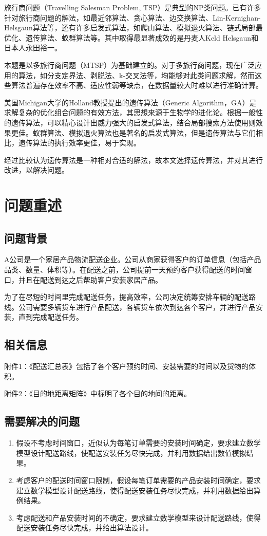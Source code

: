 \documentclass[UTF8,cs4size]{ctexart}
\begin{document}
旅行商问题（Travelling Salesman Problem, TSP）是典型的NP类问题。已有许多针对旅行商问题的解法，如最近邻算法、贪心算法、边交换算法、Lin-Kernighan-Helsgaun算法等，还有许多启发式算法，如爬山算法、模拟退火算法、链式局部最优化、遗传算法、蚁群算法等。其中取得最显著成效的是丹麦人Keld Helsgaun和日本人永田裕一。

本题是以多旅行商问题（MTSP）为基础建立的。对于多旅行商问题，现在广泛应用的算法，如分支定界法、剥脱法、k-{}交叉法等，均能够对此类问题求解，然而这些算法普遍存在效率不高、适应性弱等缺点，在数据量较大时难以进行准确计算。

美国Michigan大学的Holland教授提出的遗传算法（Generic Algorithm，GA）是求解复杂的优化组合问题的有效方法，其思想来源于生物学的进化论。根据一般性的遗传算法，可以精心设计出威力强大的启发式算法，结合局部搜索方法使用则效果更佳。蚁群算法、模拟退火算法也是著名的启发式算法，但是遗传算法与它们相比，遗传算法的执行效率更佳，易于实现。

经过比较认为遗传算法是一种相对合适的解法，故本文选择遗传算法，并对其进行改进，以解决问题。
\section{问题重述}
\subsection{问题背景}
A公司是一个家居产品物流配送企业。公司从商家获得客户的订单信息（包括产品品类、数量、体积等）。在配送之前，公司提前一天预约客户获得配送的时间窗口，并且在配送到达之后帮助客户安装家居产品。

为了在尽短的时间里完成配送任务，提高效率，公司决定统筹安排车辆的配送路线。公司需要多辆货车进行产品配送，各辆货车依次到达各个客户，并进行产品安装，直到完成配送任务。
\subsection{相关信息}
附件1：《配送汇总表》包括了各个客户预约时间、安装需要的时间以及货物的体积。

附件2：《目的地距离矩阵》中标明了各个目的地间的距离。
\subsection{需要解决的问题}
\begin{enumerate}
\item 假设不考虑时间窗口，近似认为每笔订单需要的安装时间确定，要求建立数学模型设计配送路线，使配送安装任务尽快完成，并利用数据给出数值模拟结果。
\item 考虑客户的配送时间窗口限制，假设每笔订单需要的产品安装时间确定，要求建立数学模型设计配送路线，使得配送安装任务尽快完成，并利用数据给出算例结果。
\item 考虑配送和产品安装时间的不确定，要求建立数学模型来设计配送路线，使得配送安装任务尽快完成，并给出算法设计。
\end{enumerate}
\end{document}
